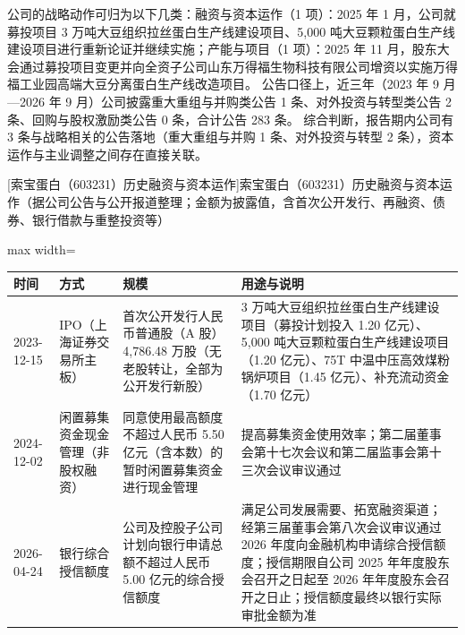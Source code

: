  公司的战略动作可归为以下几类：融资与资本运作（1 项）：2025 年 1 月，公司就募投项目 3 万吨大豆组织拉丝蛋白生产线建设项目、5,000 吨大豆颗粒蛋白生产线建设项目进行重新论证并继续实施；产能与项目（1 项）：2025 年 11 月，股东大会通过募投项目变更并向全资子公司山东万得福生物科技有限公司增资以实施万得福工业园高端大豆分离蛋白生产线改造项目。 公告口径上，近三年（2023 年 9 月---2026 年 9 月）公司披露重大重组与并购类公告 1 条、对外投资与转型类公告 2 条、回购与股权激励类公告 0 条，合计公告 283 条。 综合判断，报告期内公司有 3 条与战略相关的公告落地（重大重组与并购 1 条、对外投资与转型 2 条），资本运作与主业调整之间存在直接关联。

\begin{center}\small\setlength{\tabcolsep}{4pt}
[索宝蛋白（603231）历史融资与资本运作]{索宝蛋白（603231）历史融资与资本运作（据公司公告与公开报道整理；金额为披露值，含首次公开发行、再融资、债券、银行借款与重整投资等）}
\begin{adjustbox}{max width=\textwidth}
\begin{tabular}{@{}p{1.45cm}p{2.55cm}p{4.05cm}p{4.95cm}@{}}
\toprule
时间 & 方式 & 规模 & 用途与说明 \\
\midrule
2023-12-15 & IPO（上海证券交易所主板） & 首次公开发行人民币普通股（A 股）4,\allowbreak{}786.48 万股（无老股转让，\allowbreak{}全部为公开发行新股） & 3 万吨大豆组织拉丝蛋白生产线建设项目（募投计划投入 1.20 亿元）、\allowbreak{}5,\allowbreak{}000 吨大豆颗粒蛋白生产线建设项目（1.20 亿元）、\allowbreak{}75T 中温中压高效煤粉锅炉项目（1.45 亿元）、\allowbreak{}补充流动资金（1.70 亿元） \\
2024-12-02 & 闲置募集资金现金管理（非股权融资） & 同意使用最高额度不超过人民币 5.50 亿元（含本数）的暂时闲置募集资金进行现金管理 & 提高募集资金使用效率；第二届董事会第十七次会议和第二届监事会第十三次会议审议通过 \\
2026-04-24 & 银行综合授信额度 & 公司及控股子公司计划向银行申请总额不超过人民币 5.00 亿元的综合授信额度 & 满足公司发展需要、\allowbreak{}拓宽融资渠道；经第三届董事会第八次会议审议通过 2026 年度向金融机构申请综合授信额度；授信期限自公司 2025 年年度股东会召开之日起至 2026 年年度股东会召开之日止；授信额度最终以银行实际审批金额为准 \\
\bottomrule
\end{tabular}
\end{adjustbox}
\end{center}

